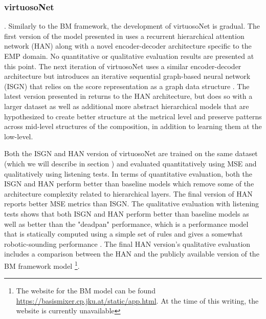 \subsubsection{virtuosoNet}
. 
Similarly to the BM framework, the development of virtuosoNet is gradual. The first version of the model presented in \cite{jeong2018virtuosonet} uses a recurrent hierarchical attention network (HAN) along with a novel encoder-decoder architecture specific to the EMP domain. No quantitative or qualitative evaluation results are presented at this point. The next iteration of virtuosoNet uses a similar encoder-decoder architecture but introduces an iterative sequential graph-based neural network (ISGN) that relies on the score representation as a graph data structure \cite{jeong2019graph}. The latest version presented in \cite{jeong2019virtuosonet} returns to the HAN architecture, but does so with a larger dataset as well as additional more abstract hierarchical models that are hypothesized to create better structure at the metrical level and preserve patterns across mid-level structures of the composition, in addition to learning them at the low-level.  

Both the ISGN\cite{jeong2019graph} and HAN\cite{jeong2019virtuosonet} version of virtuosoNet are trained on the same dataset (which we will describe in section ) and evaluated quantitatively using MSE and qualitatively using listening tests. In terms of quantitative evaluation, both the ISGN and HAN perform better than baseline models which remove some of the architecture complexity related to hierarchical layers. The final version of HAN reports better MSE metrics than ISGN. The qualitative evaluation with listening tests shows that both ISGN and HAN perform better than baseline models as well as better than the "deadpan" performance, which is a performance model that is statically computed using a simple set of rules and gives a somewhat robotic-sounding performance . The final HAN version's qualitative evaluation includes a comparison between the HAN and the publicly available version of the BM framework model \footnote{The website for the BM model can be found \href{here}{https://basismixer.cp.jku.at/static/app.html}. At the time of this writing, the website is currently unavailable}. 


